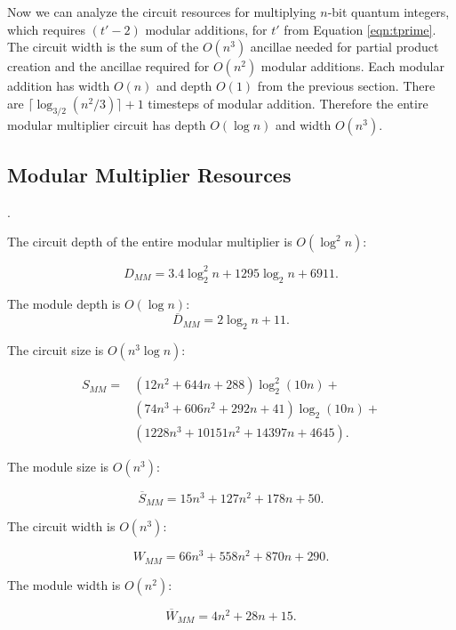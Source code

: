 \documentclass[twoside]{article}
\begin{document}
Now we can analyze the circuit resources for multiplying $n$-bit
quantum integers, which requires $(t'-2)$ modular additions, for $t'$ from
Equation \ref{eqn:tprime}.
The circuit width is the sum of the $O(n^3)$ ancillae
needed for partial product creation and the ancillae required for $O(n^2)$
modular additions. Each modular addition has width $O(n)$ and depth $O(1)$
from the previous
section. There are
$\lceil \log_{3/2}(n^2 / 3) \rceil +1 $ timesteps of modular addition. Therefore
the entire modular multiplier circuit has depth $O(\log n)$ and width $O(n^3)$.

\subsection{Modular Multiplier Resources}
\label{subsec:mod-mult-resources}.

The circuit depth of the entire modular multiplier is $O(\log^2 n)$:

\begin{equation}
D_{MM} = 3.4 \log_2^2 n + 1295 \log_2 n + 6911\text{.}
\end{equation}

The module depth is $O(\log n)$:
\begin{equation}
\overline{D}_{MM} = 2\log_2 n + 11\text{.}
\end{equation}

The circuit size is $O(n^3\log n)$:

\begin{eqnarray}
S_{MM} = & (12n^2 + 644n + 288)\log_2^2 (10n) +\\
        & (74n^3 + 606n^2 + 292n + 41)\log_2 (10n) +\\
        & (1228n^3 + 10151n^2 + 14397n + 4645)\text{.}
\end{eqnarray}

The module size is $O(n^3)$:

\begin{equation}
\overline{S}_{MM} = 15n^3 + 127n^2 + 178n + 50{.}
\end{equation}

The circuit width is $O(n^3)$:

\begin{equation}
W_{MM} = 66n^3 + 558n^2 + 870n + 290\text{.}
\end{equation}

The module width is $O(n^2)$:

\begin{equation}
\overline{W}_{MM} = 4n^2 + 28n + 15\text{.}
\end{equation}
\end{document}
